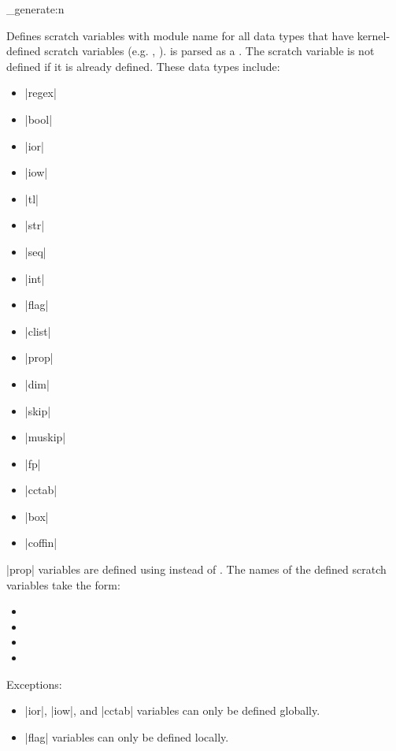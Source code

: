 \documentclass{l3doc}
\begin{document}
\begin{function}{\scratchvar_generate:n}
  \begin{syntax}
     
  \end{syntax}
  Defines scratch variables with module name  for all 
  data types that have kernel-defined scratch variables (e.g. ,
  ).
   is parsed as a .
  The scratch variable is not defined if it is already defined.
  These data types include:
  \begin{itemize}
    \item |regex|
    \item |bool|
    \item |ior|
    \item |iow|
    \item |tl|
    \item |str|
    \item |seq|
    \item |int|
    \item |flag|
    \item |clist|
    \item |prop|
    \item |dim|
    \item |skip|
    \item |muskip|
    \item |fp|
    \item |cctab|
    \item |box|
    \item |coffin|
  \end{itemize}
  |prop| variables are defined using  instead of
  .
  The names of the defined scratch variables take the form:
  \begin{itemize}
    \item {}
    \item {}
    \item {}
    \item {}
  \end{itemize}
  Exceptions:
  \begin{itemize}
    \item |ior|, |iow|, and |cctab| variables can only be defined globally.
    \item |flag| variables can only be defined locally.
  \end{itemize}
\end{function}
\end{document}
